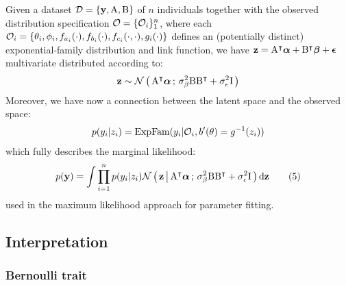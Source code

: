 Given a dataset $\mathcal{D} = \{\mathbf y, \mathrm A, \mathrm B\}$ of $n$
individuals together with the observed distribution specification
$\mathcal{O}=\{\mathcal{O}_i\}_1^n$, where each
$\mathcal{O}_i = \{\theta_i, \phi_i, f_{a_i}(\cdot), f_{b_i}(\cdot), f_{c_i}(\cdot, \cdot), g_i(\cdot)\}$
defines an (potentially distinct) exponential-family distribution and link
function, we have
$\mathbf z = \mathrm A^\intercal\boldsymbol\alpha + \mathrm B^\intercal\boldsymbol\beta + \boldsymbol\epsilon$
multivariate distributed according to:
\begin{align*}
  \mathbf z \sim \mathcal{N}\left(\, {\mathrm A^\intercal \boldsymbol\alpha} \,;\, {\sigma^2_{\beta} \mathrm B\mathrm
	B^\intercal + \sigma^2_{\epsilon} \mathrm I} \,\right)
\end{align*}
Moreover, we have now a connection between the latent space and the observed
space:
\begin{align*}
  p(y_i | z_i) = \text{ExpFam} ({y_i | \mathcal{O}_i, b'(\theta)=g^{-1}(z_i)})
\end{align*}
which fully describes the marginal likelihood:
\begin{align}\label{eq:ml}
  p(\mathbf y) = \int \prod_{i=1}^n p(y_i|z_i) \mathcal{N}\left(\, { {\mathbf z} \, \big| \, {\mathrm A^\intercal
	\boldsymbol\alpha} } \,;\, { {\sigma^2_{\beta} \mathrm B\mathrm B^\intercal + \sigma^2_{\epsilon}
	\mathrm I} } \,\right) \mathrm d \mathbf z \tag{5}
\end{align}
used in the maximum likelihood approach for parameter fitting.

\subsection{Interpretation}

\subsubsection{Bernoulli trait}

